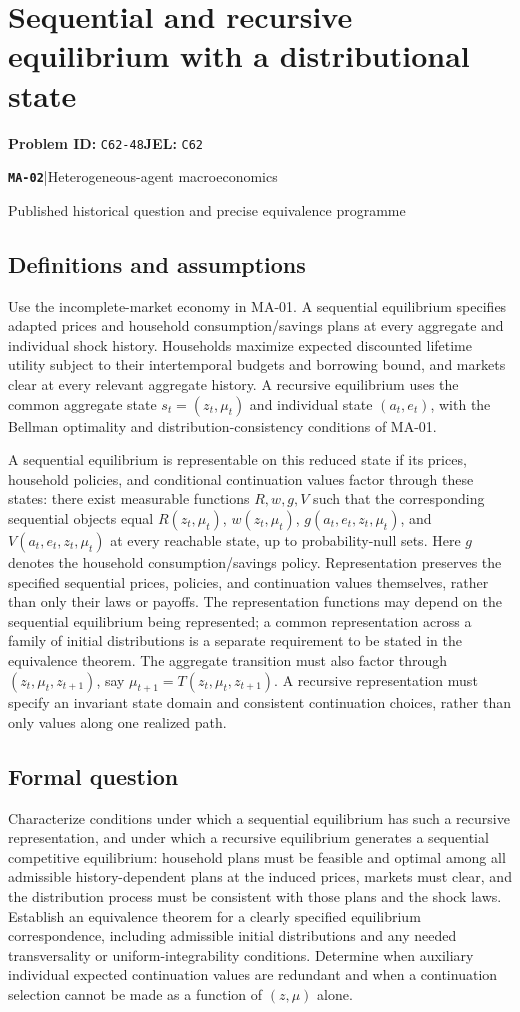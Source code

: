 \documentclass[11pt,a4paper]{article}
\newcommand{\entrymeta}[3]{{\sffamily\small\color{muted}\textbf{\texttt{#1}}\quad|\quad #2\par #3\par}}
\begin{document}
\section*{Sequential and recursive equilibrium with a distributional state}
\textbf{Problem ID:} \texttt{C62-48}\quad \textbf{JEL:} \texttt{C62}\par
\label{problem:OP-0583}
\label{beyond:MA-02}
\entrymeta{MA-02}{Heterogeneous-agent macroeconomics}{Published historical question and precise equivalence programme}
\subsection*{Definitions and assumptions}
Use the incomplete-market economy in MA-01. A sequential equilibrium specifies adapted prices and household consumption/savings plans at every aggregate and individual shock history. Households maximize expected discounted lifetime utility subject to their intertemporal budgets and borrowing bound, and markets clear at every relevant aggregate history. A recursive equilibrium uses the common aggregate state $s_t=(z_t,\mu_t)$ and individual state $(a_t,e_t)$, with the Bellman optimality and distribution-consistency conditions of MA-01.

A sequential equilibrium is representable on this reduced state if its prices, household policies, and conditional continuation values factor through these states: there exist measurable functions $R,w,g,V$ such that the corresponding sequential objects equal $R(z_t,\mu_t)$, $w(z_t,\mu_t)$, $g(a_t,e_t,z_t,\mu_t)$, and $V(a_t,e_t,z_t,\mu_t)$ at every reachable state, up to probability-null sets. Here $g$ denotes the household consumption/savings policy. Representation preserves the specified sequential prices, policies, and continuation values themselves, rather than only their laws or payoffs. The representation functions may depend on the sequential equilibrium being represented; a common representation across a family of initial distributions is a separate requirement to be stated in the equivalence theorem. The aggregate transition must also factor through $(z_t,\mu_t,z_{t+1})$, say $\mu_{t+1}=T(z_t,\mu_t,z_{t+1})$. A recursive representation must specify an invariant state domain and consistent continuation choices, rather than only values along one realized path.
\subsection*{Formal question}
Characterize conditions under which a sequential equilibrium has such a recursive representation, and under which a recursive equilibrium generates a sequential competitive equilibrium: household plans must be feasible and optimal among all admissible history-dependent plans at the induced prices, markets must clear, and the distribution process must be consistent with those plans and the shock laws. Establish an equivalence theorem for a clearly specified equilibrium correspondence, including admissible initial distributions and any needed transversality or uniform-integrability conditions. Determine when auxiliary individual expected continuation values are redundant and when a continuation selection cannot be made as a function of $(z,\mu)$ alone.
\end{document}
